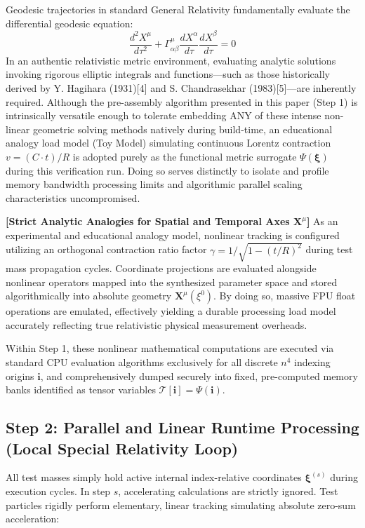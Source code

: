\documentclass[11pt]{article}
\begin{document}
Geodesic trajectories in standard General Relativity fundamentally evaluate the differential geodesic equation:
\[ \frac{d^2 X^\mu}{d\tau^2} + \Gamma^\mu_{\alpha\beta} \frac{dX^\alpha}{d\tau} \frac{dX^\beta}{d\tau} = 0 \]
In an authentic relativistic metric environment, evaluating analytic solutions invoking rigorous elliptic integrals and functions—such as those historically derived by Y. Hagihara (1931)[4] and S. Chandrasekhar (1983)[5]—are inherently required. Although the pre-assembly algorithm presented in this paper (Step 1) is intrinsically versatile enough to tolerate embedding ANY of these intense non-linear geometric solving methods natively during build-time, an educational analogy load model (Toy Model) simulating continuous Lorentz contraction $v = (C \cdot t)/R$ is adopted purely as the functional metric surrogate $\Psi(\boldsymbol{\xi})$ during this verification run. Doing so serves distinctly to isolate and profile memory bandwidth processing limits and algorithmic parallel scaling characteristics uncompromised.

\textbf{[Strict Analytic Analogies for Spatial and Temporal Axes $\mathbf{X}^\mu$]}
As an experimental and educational analogy model, nonlinear tracking is configured utilizing an orthogonal contraction ratio factor $\gamma = 1/\sqrt{1 - (t/R)^2}$ during test mass propagation cycles. Coordinate projections are evaluated alongside nonlinear operators mapped into the synthesized parameter space and stored algorithmically into absolute geometry $\mathbf{X}^\mu(\xi^0)$. By doing so, massive FPU float operations are emulated, effectively yielding a durable processing load model accurately reflecting true relativistic physical measurement overheads.

Within Step 1, these nonlinear mathematical computations are executed via standard CPU evaluation algorithms exclusively for all discrete $n^4$ indexing origins $\mathbf{i}$, and comprehensively dumped securely into fixed, pre-computed memory banks identified as tensor variables $\mathcal{T}[\mathbf{i}] = \Psi(\mathbf{i})$.

\subsection{Step 2: Parallel and Linear Runtime Processing (Local Special Relativity Loop)}
All test masses simply hold active internal index-relative coordinates $\boldsymbol{\xi}^{(s)}$ during execution cycles.
In step $s$, accelerating calculations are strictly ignored. Test particles rigidly perform elementary, linear tracking simulating absolute zero-sum acceleration:
\end{document}
